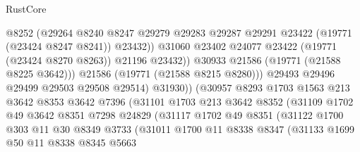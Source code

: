 \begin{lexlean}{RustCore}
\begin{coremodule}
                                  @8252
                                  (@29264
                                    @8240
                                    @8247
                                    @29279
                                    @29283
                                    @29287
                                    @29291
                                    @23422
                                    (@19771 (@23424 @8247 @8241))
                                    @23432))
                                @31060
                                @23402
                                @24077
                                @23422
                                (@19771 (@23424 @8270 @8263))
                                @21196
                                @23432))
                            @30933
                            @21586
                            (@19771 (@21588 @8225 @3642)))
                          @21586
                          (@19771 (@21588 @8215 @8280)))
                        @29493
                        @29496
                        @29499
                        @29503
                        @29508
                        @29514)
                      @31930))
                  (@30957
                    @8293
                    @1703
                    @1563
                    @213
                    @3642
                    @8353
                    @3642
                    @7396
                    (@31101
                      @1703
                      @213
                      @3642
                      @8352
                      (@31109
                        @1702
                        @49
                        @3642
                        @8351
                        @7298
                        @24829
                        (@31117
                          @1702
                          @49
                          @8351
                          (@31122
                            @1700
                            @303
                            @11
                            @30
                            @8349
                            @3733
                            (@31011
                              @1700
                              @11
                              @8338
                              @8347
                              (@31133
                                @1699
                                @50
                                @11
                                @8338
                                @8345
                                @5663

\end{coremodule}
\end{lexlean}
